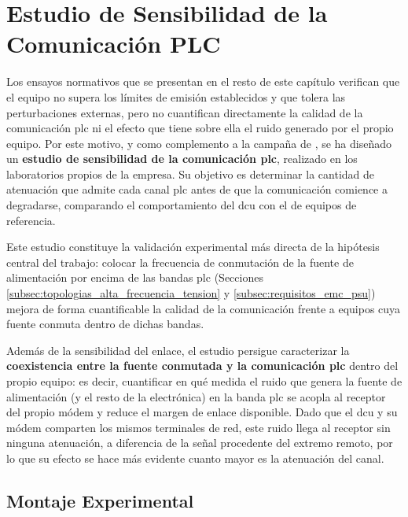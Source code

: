 \section{Estudio de Sensibilidad de la Comunicación PLC}
\label{sec:sensibilidad_plc}

Los ensayos normativos que se presentan en el resto de este capítulo verifican que el equipo no supera los límites de emisión establecidos y que tolera las perturbaciones externas, pero no cuantifican directamente la calidad de la comunicación \gls{plc} ni el efecto que tiene sobre ella el ruido generado por el propio equipo. Por este motivo, y como complemento a la campaña de , se ha diseñado un \textbf{estudio de sensibilidad de la comunicación \gls{plc}}, realizado en los laboratorios propios de la empresa. Su objetivo es determinar la cantidad de atenuación que admite cada canal \gls{plc} antes de que la comunicación comience a degradarse, comparando el comportamiento del \gls{dcu} con el de equipos de referencia.

Este estudio constituye la validación experimental más directa de la hipótesis central del trabajo: colocar la frecuencia de conmutación de la fuente de alimentación por encima de las bandas \gls{plc} (Secciones \ref{subsec:topologias_alta_frecuencia_tension} y \ref{subsec:requisitos_emc_psu}) mejora de forma cuantificable la calidad de la comunicación frente a equipos cuya fuente conmuta dentro de dichas bandas.

Además de la sensibilidad del enlace, el estudio persigue caracterizar la \textbf{coexistencia entre la fuente conmutada y la comunicación \gls{plc}} dentro del propio equipo: es decir, cuantificar en qué medida el ruido que genera la fuente de alimentación (y el resto de la electrónica) en la banda \gls{plc} se acopla al receptor del propio módem y reduce el margen de enlace disponible. Dado que el \gls{dcu} y su módem comparten los mismos terminales de red, este ruido llega al receptor sin ninguna atenuación, a diferencia de la señal procedente del extremo remoto, por lo que su efecto se hace más evidente cuanto mayor es la atenuación del canal.

\subsection{Montaje Experimental}
\label{subsec:montaje_sensibilidad}


